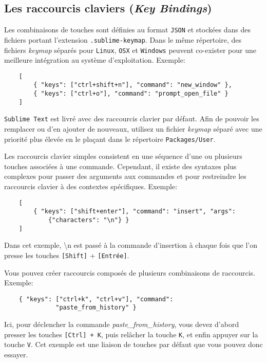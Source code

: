 \documentclass[french,a4paper]{article}
\begin{document}
\subsection*{Les raccourcis claviers (\textit{Key Bindings})}
Les combinaisons de touches sont définies au format \texttt{JSON} et stockées 
 dans des fichiers portant l'extension \texttt{.sublime-keymap}. Dans le même 
 répertoire, des fichiers \textit{keymap} séparés pour \texttt{Linux}, 
 \texttt{OSX} et \texttt{Windows} peuvent co-exister pour une meilleure 
 intégration au système d'exploitation. Exemple:
\begin{verbatim}
    [
        { "keys": ["ctrl+shift+n"], "command": "new_window" },
        { "keys": ["ctrl+o"], "command": "prompt_open_file" }
    ]
\end{verbatim}
\medskip

\texttt{Sublime Text} est livré avec des raccourcis clavier par défaut. Afin de
 pouvoir les remplacer ou d'en ajouter de nouveaux, utilisez un fichier 
 \textit{keymap} séparé avec une priorité plus élevée en le plaçant dans le 
 répertoire \texttt{Packages/User}.
\medskip

Les raccourcis clavier simples consistent en une séquence d'une ou plusieurs 
 touches associées à une commande. Cependant, il existe des syntaxes plus 
 complexes pour passer des arguments aux commandes et pour restreindre les 
 raccourcis clavier à des contextes spécifiques. Exemple:
\begin{verbatim}
    [
        { "keys": ["shift+enter"], "command": "insert", "args": 
            {"characters": "\n"} }
    ]    
\end{verbatim}
\medskip

Dans cet exemple, \og \textbackslash{n}\fg{} est passé à la commande 
 d'insertion à chaque fois que l'on presse les touches \texttt{[Shift]} + 
 \texttt{[Entrée]}.  
\medskip

Vous pouvez créer raccourcis composés de plusieurs combinaisons de raccourcis.
Exemple:
\begin{verbatim}
    { "keys": ["ctrl+k", "ctrl+v"], "command": 
              "paste_from_history" }
\end{verbatim}
\medskip

Ici, pour déclencher la commande \textit{paste\_from\_history}, vous devez 
 d'abord presser les touches \texttt{[Ctrl] + K}, puis relâcher la touche 
 \texttt{K}, et enfin appuyer sur la touche \texttt{V}. Cet exemple est une
 liaison de touches par défaut que vous pouvez donc essayer.
 \bigskip
\end{document}
